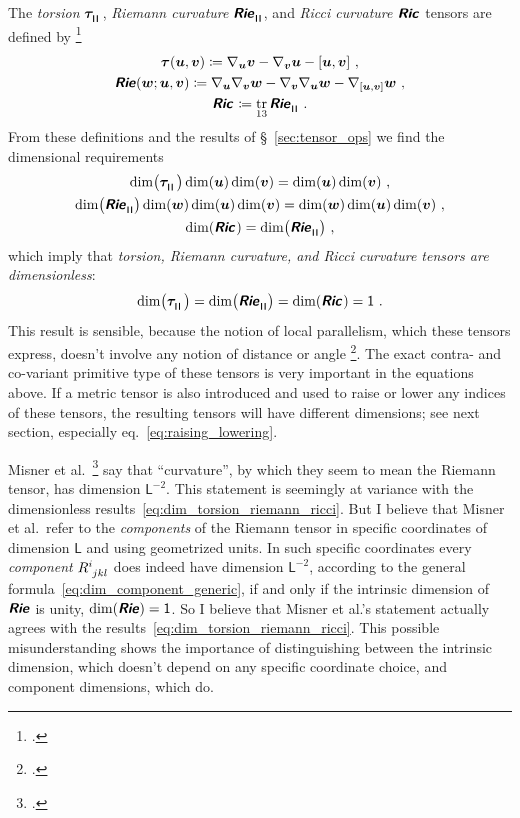 \documentclass[\ifafour a4paper,12pt,\else a5paper,10pt,\fi%
onecolumn,oneside,article,%
british%
]{memoir}
\makeatletter
\theoremstyle{remark}
\theoremstyle{innote}
\newcommand*{\mathte}[1]{\textbf{\textit{\textsf{#1}}}}
\newcommand*{\citep}{\footcites}
\DeclareMathOperator{\tr}{tr}%
\newcommand*{\defd}{\coloneqq}
\DeclarePairedDelimiter\clcl{[}{]}
\renewcommand*{\|}[1][]{\nonscript\,#1\vert\nonscript\;\mathopen{}}
\newcommand*{\sect}{\S}%
\newcommand*{\eqn}{eq.}%
\newcommand*{\cf}{{cf.}}
\newcommand*{\etal}{{et al.}}
\newcommand*{\q}{}%
\DeclareRobustCommand*{\q}{%
  \mathord{\mathpalette\bigcdot@{}}%
}
\newcommand*{\bigcdot@scalefactor}{0.7}
\newcommand*{\bigcdot@widthfactor}{1.5}
\newcommand*{\bigcdot@}[2]{%
  \sbox0{$#1\vcenter{}$}%
  \sbox2{$#1\cdot\m@th$}%
  \hbox to \bigcdot@widthfactor\wd2{%
    \hfil
    \raise\ht0\hbox{%
      \scalebox{\bigcdot@scalefactor}{%
        \lower\ht0\hbox{$#1\bullet\m@th$}%
      }%
    }%
    \hfil
  }%
}
\newcommand*{\Un}{\textsf{1}}
\newcommand*{\Le}{\textsf{L}}
\newcommand*{\yR}{\mathte{Rie}}
\newcommand*{\yRi}{\mathte{Ric}}
\newcommand*{\yTo}{\bm{\tau}}
\newcommand*{\yv}{\bm{v}}
\newcommand*{\yu}{\bm{u}}
\newcommand*{\yw}{\bm{w}}
\renewcommand*{\i}{\indices}
\newcommand*{\nab}{\nabla}
\newcommand*{\rul}{{\mkern2mu\rule[-0.1ex]{0.75pt}{1.1ex}\mkern2mu}}
\DeclarePairedDelimiter\mul{\rul}{\rul}%
\makeatother
\begin{document}
The \emph{torsion} $\yTo\i{^{\q}_{\mul{\q\q}}}$, \emph{Riemann
  curvature} $\yR\i{^{\q}_{\q\mul{\q\q}}}$, and \emph{Ricci
  curvature} $\yRi\i{_{\q\q}}$ tensors are defined by
\citep[\sect~V.B.1]{choquetbruhatetal1977_r1996}
\begin{gather}
  \label{eq:torsion_eq}
\yTo(\yu,\yv) \defd \nab_{\yu}\yv - \nab_{\yv}\yu - \clcl{\yu,\yv}\ ,
\\
\yR(\yw;\yu,\yv) \defd
\nab_{\yu}\nab_{\yv}\yw - \nab_{\yv}\nab_{\yu}\yw
- \nab_{\clcl{\yu,\yv}}\yw\ ,
  \label{eq:riemann_eq}  
\\
\yRi\i{_{\q\q}} \defd \tr_{13} \yR\i{^{\q}_{\q\mul{\q\q}}} \ .
  \label{eq:ricci_eq}  
\end{gather}
From these definitions and the results of \sect~\ref{sec:tensor_ops} we
find the dimensional requirements
\begin{gather}
  \label{eq:torsion_eq_dim}
\dim\bigl(\yTo\i{^{\q}_{\mul{\q\q}}}\bigr)\dim(\yu)\dim(\yv) = \dim(\yu) \dim(\yv)\ ,
\\
\dim\bigl(\yR\i{^{\q}_{\q\mul{\q\q}}}\bigr)\dim(\yw)\dim(\yu)\dim(\yv) =
\dim(\yw)\dim(\yu)\dim(\yv)\ ,
\label{eq:riemann_eq_dim}
\\
\dim(\yRi\i{_{\q\q}}) = \dim\bigl(\yR\i{^{\q}_{\q\mul{\q\q}}}\bigr)\ ,
  \label{eq:ricci_eq_dim}  
\end{gather}
which imply that \emph{torsion, Riemann curvature, and Ricci curvature
  tensors are dimensionless}:
\begin{equation}
  \label{eq:dim_torsion_riemann_ricci}
  \dim\bigl(\yTo\i{^{\q}_{\mul{\q\q}}}\bigr) =
   \dim\bigl(\yR\i{^{\q}_{\q\mul{\q\q}}}\bigr) =
   \dim(\yRi\i{_{\q\q}}) =\Un\ .
\end{equation}
This result is sensible, because the notion of local parallelism, which
these tensors express, doesn't involve any notion of distance or angle
\citep[\cf][]{portamana2011_r2019}. The exact contra- and co-variant
primitive type of these tensors is very important in the equations above.
If a metric tensor is also introduced and used to raise or lower any
indices of these tensors, the resulting tensors will have different
dimensions; see next section, especially \eqn~\eqref{eq:raising_lowering}.

Misner \etal\ \citep[p.~35%
]{misneretal1970_r1973} say that \enquote{curvature}, by which they seem to
mean the Riemann tensor, has dimension $\Le^{-2}$. This statement is
seemingly at variance with the dimensionless
results~\eqref{eq:dim_torsion_riemann_ricci}. But I believe that Misner
\etal\ refer to the \emph{components} of the Riemann tensor in specific
coordinates of dimension $\Le$ and using geometrized units. In such
specific coordinates every \emph{component} $R\i{^{i}_{jkl}}$ does indeed
have dimension $\Le^{-2}$, according to the general
formula~\eqref{eq:dim_component_generic}, if and only if the intrinsic
dimension of $\yR$ is unity, $\dim(\yR)=\Un$. So I believe that Misner
\etal's statement actually agrees with the
results~\eqref{eq:dim_torsion_riemann_ricci}. This possible
misunderstanding shows the importance of distinguishing between the
intrinsic dimension, which doesn't depend on any specific coordinate
choice, and component dimensions, which do.
\end{document}
